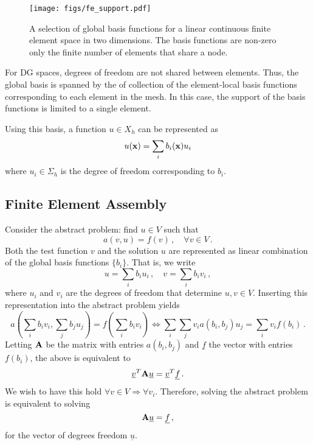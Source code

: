 \documentclass[../doc.tex]{subfiles}
\begin{document}
\begin{figure}
\centering
\texttt{[image: figs/fe\_support.pdf]}
\caption{A selection of global basis functions for a linear continuous finite element space in two dimensions. The basis functions are non-zero only the finite number of elements that share a node. }
\label{fem:fe_support}
\end{figure}

For DG spaces, degrees of freedom are not shared between elements. Thus, the global basis is spanned by the of collection of the element-local basis functions corresponding to each element in the mesh. In this case, the support of the basis functions is limited to a single element. 

Using this basis, a function $u \in X_h$ can be represented as 
	\begin{equation}
		u(\boldsymbol{\mathrm{x}}) = \sum_i b_i(\boldsymbol{\mathrm{x}}) u_i 
	\end{equation}
where $u_i \in \Sigma_h$ is the degree of freedom corresponding to $b_i$. 

\subsection{Finite Element Assembly}
Consider the abstract problem: find $u \in V$ such that 
	\begin{equation}
		a(v,u) = f(v) \,, \quad \forall v \in V \,. 
	\end{equation}
Both the test function $v$ and the solution $u$ are represented as linear combination of the global basis functions $\{b_i\}$. That is, we write 
	\begin{equation}
		u = \sum_i b_i u_i \,, \quad v = \sum_i b_i v_i \,,
	\end{equation}
where $u_i$ and $v_i$ are the degrees of freedom that determine $u,v \in V$. Inserting this representation into the abstract problem yields 
	\begin{equation}
		a(\sum_i b_i v_i, \sum_j b_j u_j) = f(\sum_i b_i v_i) \iff \sum_i \sum_j v_i a(b_i,b_j) u_j = \sum_i v_i f(b_i) \,. 
	\end{equation} 
Letting $\boldsymbol{\mathrm{A}}$ be the matrix with entries $a(b_i, b_j)$ and $\underline{f}$ the vector with entries $f(b_i)$, the above is equivalent to 
	\begin{equation}
		\underline{v}^T \boldsymbol{\mathrm{A}} \underline{u} = \underline{v}^T \underline{f} \,. 
	\end{equation}
We wish to have this hold $\forall v \in V \Rightarrow \forall v_i$. Therefore, solving the abstract problem is equivalent to solving 
	\begin{equation}
		\boldsymbol{\mathrm{A}} \underline{u} = \underline{f} \,, 
	\end{equation}
for the vector of degrees freedom $\underline{u}$. 
\end{document}
